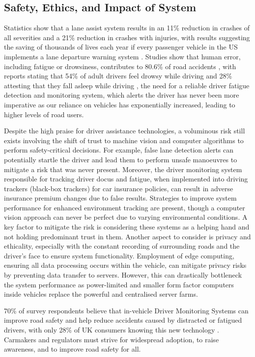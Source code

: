 \documentclass[9pt,conference]{IEEEtran}
\begin{document}
\subsection{Safety, Ethics, and Impact of System}

Statistics show that a lane assist system results in an 11\% reduction in crashes of all severities and a 21\% reduction in crashes with injuries, with results suggesting the saving of thousands of lives each year if every passenger vehicle in the US implements a lane departure warning system \cite{b23}. Studies show that human error, including fatigue or drowsiness, contributes to 80.6\% of road accidents \cite{b24}, with reports stating that 54\% of adult drivers feel drowsy while driving and 28\% attesting that they fall asleep while driving \cite{b25}, the need for a reliable driver fatigue detection and monitoring system, which alerts the driver has never been more imperative as our reliance on vehicles has exponentially increased, leading to higher levels of road users.

Despite the high praise for driver assistance technologies, a voluminous risk still exists involving the shift of trust to machine vision and computer algorithms to perform safety-critical decisions. For example, false lane detection alerts can potentially startle the driver and lead them to perform unsafe manoeuvres to mitigate a risk that was never present. Moreover, the driver monitoring system responsible for tracking driver docus and fatigue, when implemented into driving trackers (black-box trackers) for car insurance policies, can result in adverse insurance premium changes due to false results. Strategies to improve system performance for enhanced environment tracking are present, though a computer vision approach can never be perfect due to varying environmental conditions. A key factor to mitigate the risk is considering these systems as a helping hand and not holding predominant trust in them. Another aspect to consider is privacy and ethicality, especially with the constant recording of surrounding roads and the driver's face to ensure system functionality. Employment of edge computing, ensuring all data processing occurs within the vehicle, can mitigate privacy risks by preventing data transfer to servers. However, this can drastically bottleneck the system performance as power-limited and smaller form factor computers inside vehicles replace the powerful and centralised server farms.

70\% of survey respondents believe that in-vehicle Driver Monitoring Systems can improve road safety and help reduce accidents caused by distracted or fatigued drivers, with only 28\% of UK consumers knowing this new technology \cite{b26}. Carmakers and regulators must strive for widespread adoption, to raise awareness, and to improve road safety for all.
\end{document}
